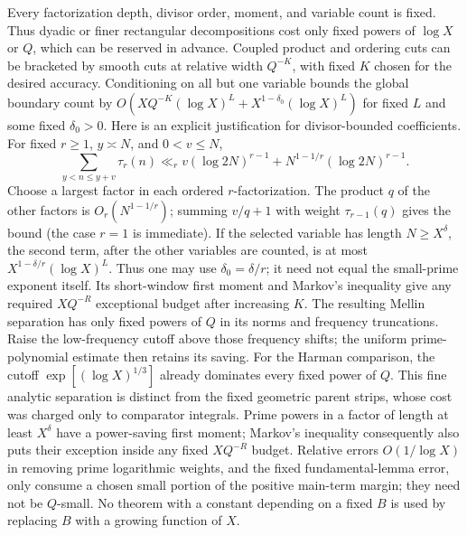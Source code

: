 Every factorization depth, divisor order, moment, and variable count
is fixed. Thus dyadic or finer rectangular decompositions cost only
fixed powers of $\log X$ or $Q$, which can be reserved in advance.
Coupled product and ordering cuts can be bracketed by smooth cuts
at relative width $Q^{-K}$, with fixed $K$ chosen for the desired
accuracy. Conditioning on all but one variable bounds the global
boundary count by $O(XQ^{-K}(\log X)^L+X^{1-\delta_0}(\log X)^L)$
for fixed $L$ and some fixed $\delta_0>0$.
Here is an explicit justification for divisor-bounded coefficients.
For fixed $r\ge1$, $y\asymp N$, and $0<v\le N$,
\[
 \sum_{y<n\le y+v}\tau_r(n)
 \ll_r v(\log 2N)^{r-1}
       +N^{1-1/r}(\log 2N)^{r-1}.
\]
Choose a largest factor in each ordered $r$-factorization.
The product $q$ of the other factors is $O_r(N^{1-1/r})$;
summing $v/q+1$ with weight $\tau_{r-1}(q)$ gives the bound
(the case $r=1$ is immediate).
If the selected variable has length $N\ge X^\delta$, the second
term, after the other variables are counted, is at most
$X^{1-\delta/r}(\log X)^L$.
Thus one may use $\delta_0=\delta/r$; it need not equal the
small-prime exponent itself.
Its short-window first moment and Markov's inequality give any
required $XQ^{-R}$ exceptional budget after increasing $K$.
The resulting Mellin separation has only fixed powers of $Q$ in
its norms and frequency truncations. Raise the low-frequency cutoff
above those frequency shifts; the uniform prime-polynomial estimate
then retains its saving. For the Harman comparison, the cutoff
$\exp[(\log X)^{1/3}]$ already dominates every fixed power of $Q$.
This fine analytic separation is distinct from the fixed geometric
parent strips, whose cost was charged only to comparator integrals.
Prime powers in a factor of length at least $X^\delta$ have a
power-saving first moment; Markov's inequality consequently also
puts their exception inside any fixed $XQ^{-R}$ budget.
Relative errors $O(1/\log X)$ in removing prime logarithmic weights,
and the fixed fundamental-lemma error, only consume a chosen small
portion of the positive main-term margin; they need not be
$Q$-small. No theorem with a constant depending on a fixed $B$
is used by replacing $B$ with a growing function of $X$.

